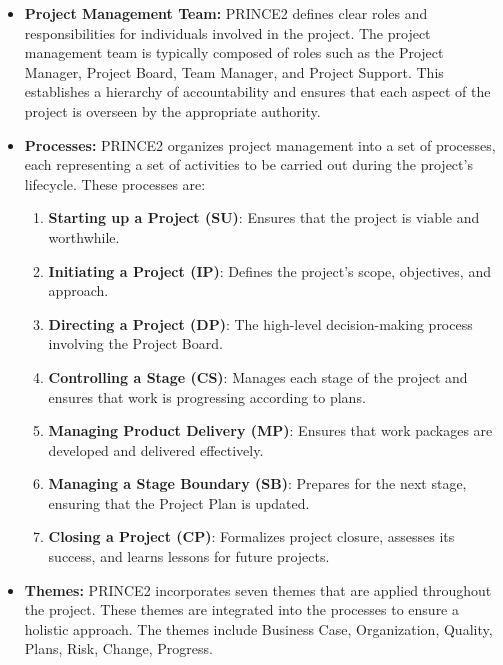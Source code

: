 \documentclass[runningheads]{llncs}
\begin{document}
\begin{itemize}[label=$\bullet$]
    \item \textbf{Project Management Team:}  
    PRINCE2 defines clear roles and responsibilities for individuals involved in the project. The project management team is typically composed of roles such as the Project Manager, Project Board, Team Manager, and Project Support. This establishes a hierarchy of accountability and ensures that each aspect of the project is overseen by the appropriate authority.\\

    \item \textbf{Processes:}
    PRINCE2 organizes project management into a set of processes, each representing a set of activities to be carried out during the project's lifecycle\cite{prince2}. These processes are:\\

        \begin{enumerate}
            \item \textbf{Starting up a Project (SU)}: Ensures that the project is viable and worthwhile.
            \item \textbf{Initiating a Project (IP)}: Defines the project's scope, objectives, and approach.
            \item \textbf{Directing a Project (DP)}: The high-level decision-making process involving the Project Board.
            \item \textbf{Controlling a Stage (CS)}: Manages each stage of the project and ensures that work is progressing according to plans.
            \item \textbf{Managing Product Delivery (MP)}: Ensures that work packages are developed and delivered effectively.
            \item \textbf{Managing a Stage Boundary (SB)}: Prepares for the next stage, ensuring that the Project Plan is updated.
            \item \textbf{Closing a Project (CP)}: Formalizes project closure, assesses its success, and learns lessons for future projects.\\
        \end{enumerate}

    \item  \textbf{Themes:}
    PRINCE2 incorporates seven themes that are applied throughout the project. These themes are integrated into the processes to ensure a holistic approach. The themes include Business Case, Organization, Quality, Plans, Risk, Change, Progress.\cite{prince3}
    
\end{itemize}
\end{document}

